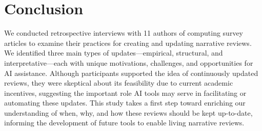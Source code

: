 \section{Conclusion}
We conducted retrospective interviews with 11 authors of computing survey articles to examine their practices for creating and updating narrative reviews. We identified three main types of updates---empirical, structural, and interpretative---each with unique motivations, challenges, and opportunities for AI assistance. Although participants supported the idea of continuously updated reviews, they were skeptical about its feasibility due to current academic incentives, suggesting the important role AI tools may serve in facilitating or automating these updates. This study takes a first step toward enriching our understanding of when, why, and how these reviews should be kept up-to-date, informing the development of future tools to enable living narrative reviews.